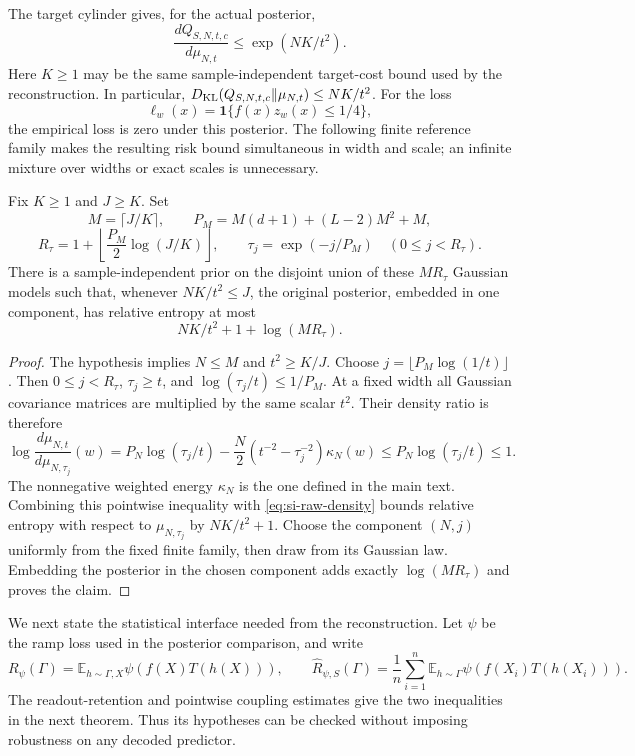 The target cylinder gives, for the actual posterior,
\begin{equation}\label{eq:si-raw-density}
 \frac{dQ_{S,N,t,c}}{d\mu_{N,t}}
 \le\exp(NK/t^2).
\end{equation}
Here $K\ge1$ may be the same sample-independent target-cost bound used
by the reconstruction. In particular,
$D_{\rm KL}(Q_{S,N,t,c}\Vert\mu_{N,t})\le NK/t^2$.
For the loss
\[
 \ell_w(x)=\mathbf1\{f(x)z_w(x)\le1/4\},
\]
the empirical loss is zero under this posterior. The following finite
reference family makes the resulting risk bound simultaneous in width
and scale; an infinite mixture over widths or exact scales is unnecessary.

\begin{lemma}
\label{lem:si-grid}
Fix $K\ge1$ and $J\ge K$. Set
\[
 M=\lceil J/K\rceil,\qquad
 P_M=M(d+1)+(L-2)M^2+M,
\]
\[
 R_\tau=1+\left\lfloor\frac{P_M}{2}\log(J/K)\right\rfloor,
 \qquad \tau_j=\exp(-j/P_M)
          \quad(0\le j<R_\tau).
\]
There is a sample-independent prior on the disjoint union of these
$MR_\tau$ Gaussian models such that, whenever $NK/t^2\le J$, the
original posterior, embedded in one component, has relative entropy at
most
\begin{equation}\label{eq:si-grid-kl}
 NK/t^2+1+\log(MR_\tau).
\end{equation}
\end{lemma}
\begin{proof}
The hypothesis implies $N\le M$ and $t^2\ge K/J$.
Choose $j=\lfloor P_M\log(1/t)\rfloor$. Then
$0\le j<R_\tau$, $\tau_j\ge t$, and
$\log(\tau_j/t)\le1/P_M$.
At a fixed width all Gaussian covariance matrices are multiplied by
the same scalar $t^2$. Their density ratio is therefore
\[
 \log\frac{d\mu_{N,t}}{d\mu_{N,\tau_j}}(w)
 =P_N\log(\tau_j/t)
   -\frac N2(t^{-2}-\tau_j^{-2})\kappa_N(w)
 \le P_N\log(\tau_j/t)\le1.
\]
The nonnegative weighted energy $\kappa_N$ is the one defined in the
main text. Combining this pointwise inequality with
\eqref{eq:si-raw-density} bounds relative entropy with respect to
$\mu_{N,\tau_j}$ by $NK/t^2+1$.
Choose the component $(N,j)$ uniformly from the fixed finite family,
then draw from its Gaussian law. Embedding the posterior in the chosen
component adds exactly $\log(MR_\tau)$ and proves the claim.
\end{proof}

We next state the statistical interface needed from the reconstruction.
Let $\psi$ be the ramp loss used in the posterior comparison, and write
\[
 R_\psi(\Gamma)=\mathbb E_{h\sim\Gamma,X}
                         \psi(f(X)T(h(X))),\qquad
 \widehat R_{\psi,S}(\Gamma)=\frac1n\sum_{i=1}^n
                 \mathbb E_{h\sim\Gamma}\psi(f(X_i)T(h(X_i))).
\]
The readout-retention and pointwise coupling estimates give the two
inequalities in the next theorem. Thus its hypotheses can be checked
without imposing robustness on any decoded predictor.

